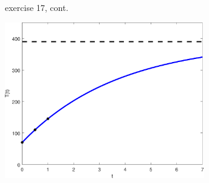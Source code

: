 \documentclass{beamer}
\begin{document}
\begin{frame}{exercise 17, cont.}

\vspace{20mm}

\hfill \includegraphics[width=0.65\textwidth]{figs/exercise-17-3-1}
\end{frame}
\end{document}
